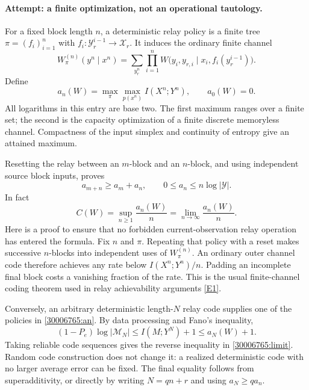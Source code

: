 \documentclass[11pt,a4paper]{article}
\newcommand{\eref}[2]{\hyperlink{extra:#1:#2}{[E#2]}}
\numberwithin{equation}{section}
\begin{document}
\paragraph{Attempt: a finite optimization, not an operational tautology.}
For a fixed block length $n$, a deterministic relay policy is a finite
tree $\pi=(f_i)_{i=1}^n$ with
$f_i:\mathcal Y_r^{i-1}\to\mathcal X_r$. It induces the ordinary finite
channel
\begin{equation}
 W_\pi^{(n)}(y^n\mid x^n)
 =\sum_{y_r^n}\prod_{i=1}^n
 W\bigl(y_i,y_{r,i}\mid x_i,f_i(y_r^{i-1})\bigr).
\end{equation}
Define
\begin{equation}\label{30006765:an}
 a_n(W)=\max_{\pi}\max_{p(x^n)}I(X^n;Y^n),\qquad a_0(W)=0.
\end{equation}
All logarithms in this entry are base two. The first maximum ranges
over a finite set; the second is the capacity optimization of a finite
discrete memoryless channel. Compactness of the input simplex and
continuity of entropy give an attained maximum.

Resetting the relay between an $m$-block and an $n$-block, and using
independent source block inputs, proves
\begin{equation}
 a_{m+n}\geq a_m+a_n,\qquad 0\leq a_n\leq n\log|\mathcal Y|.
\end{equation}
In fact
\begin{equation}\label{30006765:limit}
 C(W)=\sup_{n\geq1}\frac{a_n(W)}n
     =\lim_{n\to\infty}\frac{a_n(W)}n.
\end{equation}
Here is a proof to ensure that no forbidden current-observation relay
operation has entered the formula. Fix $n$ and $\pi$. Repeating that
policy with a reset makes successive $n$-blocks into independent uses
of $W_\pi^{(n)}$. An ordinary outer channel code therefore achieves
any rate below $I(X^n;Y^n)/n$. Padding an incomplete final block costs
a vanishing fraction of the rate. This is the usual finite-channel
coding theorem used in relay achievability arguments
\eref{30006765}{1}.

Conversely, an arbitrary deterministic length-$N$ relay code supplies
one of the policies in \eqref{30006765:an}. By data processing and Fano's
inequality,
\begin{equation}
 (1-P_e)\log|\mathcal M_N|\leq I(M;Y^N)+1
 \leq a_N(W)+1.
\end{equation}
Taking reliable code sequences gives the reverse inequality in
\eqref{30006765:limit}. Random code construction does not change it: a
realized deterministic code with no larger average error can be fixed.
The final equality follows from superadditivity, or directly by
writing $N=qn+r$ and using $a_N\geq q a_n$.
\end{document}
